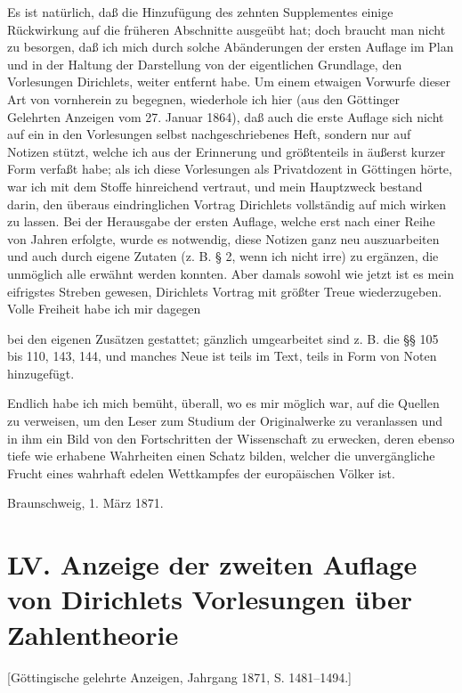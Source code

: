 \documentclass[11pt]{article}
\newcommand{\origpage}[1]{\par\vspace{0.25em}\noindent{\footnotesize\itshape [Gedruckte Seite #1]}\par\vspace{0.25em}}
\begin{document}
Es ist natürlich, daß die Hinzufügung des zehnten Supplementes einige Rückwirkung auf die früheren Abschnitte ausgeübt hat; doch braucht man nicht zu besorgen, daß ich mich durch solche Abänderungen der ersten Auflage im Plan und in der Haltung der Darstellung von der eigentlichen Grundlage, den Vorlesungen Dirichlets, weiter entfernt habe. Um einem etwaigen Vorwurfe dieser Art von vornherein zu begegnen, wiederhole ich hier (aus den Göttinger Gelehrten Anzeigen vom 27. Januar 1864), daß auch die erste Auflage sich nicht auf ein in den Vorlesungen selbst nachgeschriebenes Heft, sondern nur auf Notizen stützt, welche ich aus der Erinnerung und größtenteils in äußerst kurzer Form verfaßt habe; als ich diese Vorlesungen als Privatdozent in Göttingen hörte, war ich mit dem Stoffe hinreichend vertraut, und mein Hauptzweck bestand darin, den überaus eindringlichen Vortrag Dirichlets vollständig auf mich wirken zu lassen. Bei der Herausgabe der ersten Auflage, welche erst nach einer Reihe von Jahren erfolgte, wurde es notwendig, diese Notizen ganz neu auszuarbeiten und auch durch eigene Zutaten (z. B. § 2, wenn ich nicht irre) zu ergänzen, die unmöglich alle erwähnt werden konnten. Aber damals sowohl wie jetzt ist es mein eifrigstes Streben gewesen, Dirichlets Vortrag mit größter Treue wiederzugeben. Volle Freiheit habe ich mir dagegen

\origpage{398}
bei den eigenen Zusätzen gestattet; gänzlich umgearbeitet sind z. B. die §§ 105 bis 110, 143, 144, und manches Neue ist teils im Text, teils in Form von Noten hinzugefügt.

Endlich habe ich mich bemüht, überall, wo es mir möglich war, auf die Quellen zu verweisen, um den Leser zum Studium der Originalwerke zu veranlassen und in ihm ein Bild von den Fortschritten der Wissenschaft zu erwecken, deren ebenso tiefe wie erhabene Wahrheiten einen Schatz bilden, welcher die unvergängliche Frucht eines wahrhaft edelen Wettkampfes der europäischen Völker ist.

\begin{flushright}Braunschweig, 1. März 1871.\end{flushright}

\origpage{399}
\section*{LV. Anzeige der zweiten Auflage von Dirichlets Vorlesungen über Zahlentheorie}
\begin{center}\small [Göttingische gelehrte Anzeigen, Jahrgang 1871, S. 1481--1494.]\end{center}
\end{document}
